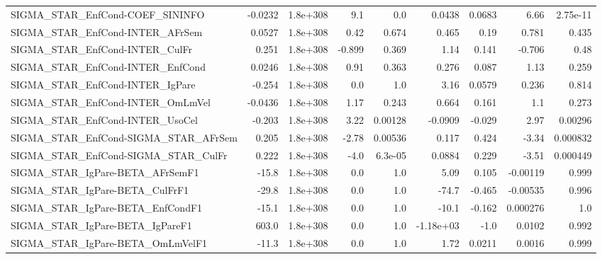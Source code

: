 \begin{tabular}{lrrrrrrrr}
SIGMA\_STAR\_EnfCond-COEF\_SININFO       &     -0.0232 &     1.8e+308 &      9.1 &      0.0 &     0.0438 &      0.0683 &         6.66 &      2.75e-11 \\
SIGMA\_STAR\_EnfCond-INTER\_AFrSem       &      0.0527 &     1.8e+308 &     0.42 &    0.674 &      0.465 &        0.19 &        0.781 &         0.435 \\
SIGMA\_STAR\_EnfCond-INTER\_CulFr        &       0.251 &     1.8e+308 &   -0.899 &    0.369 &       1.14 &       0.141 &       -0.706 &          0.48 \\
SIGMA\_STAR\_EnfCond-INTER\_EnfCond      &      0.0246 &     1.8e+308 &     0.91 &    0.363 &      0.276 &       0.087 &         1.13 &         0.259 \\
SIGMA\_STAR\_EnfCond-INTER\_IgPare       &      -0.254 &     1.8e+308 &      0.0 &      1.0 &       3.16 &      0.0579 &        0.236 &         0.814 \\
SIGMA\_STAR\_EnfCond-INTER\_OmLmVel      &     -0.0436 &     1.8e+308 &     1.17 &    0.243 &      0.664 &       0.161 &          1.1 &         0.273 \\
SIGMA\_STAR\_EnfCond-INTER\_UsoCel       &      -0.203 &     1.8e+308 &     3.22 &  0.00128 &    -0.0909 &      -0.029 &         2.97 &       0.00296 \\
SIGMA\_STAR\_EnfCond-SIGMA\_STAR\_AFrSem  &       0.205 &     1.8e+308 &    -2.78 &  0.00536 &      0.117 &       0.424 &        -3.34 &      0.000832 \\
SIGMA\_STAR\_EnfCond-SIGMA\_STAR\_CulFr   &       0.222 &     1.8e+308 &     -4.0 &  6.3e-05 &     0.0884 &       0.229 &        -3.51 &      0.000449 \\
SIGMA\_STAR\_IgPare-BETA\_AFrSemF1       &       -15.8 &     1.8e+308 &      0.0 &      1.0 &       5.09 &       0.105 &     -0.00119 &         0.999 \\
SIGMA\_STAR\_IgPare-BETA\_CulFrF1        &       -29.8 &     1.8e+308 &      0.0 &      1.0 &      -74.7 &      -0.465 &     -0.00535 &         0.996 \\
SIGMA\_STAR\_IgPare-BETA\_EnfCondF1      &       -15.1 &     1.8e+308 &      0.0 &      1.0 &      -10.1 &      -0.162 &     0.000276 &           1.0 \\
SIGMA\_STAR\_IgPare-BETA\_IgPareF1       &       603.0 &     1.8e+308 &      0.0 &      1.0 &  -1.18e+03 &        -1.0 &       0.0102 &         0.992 \\
SIGMA\_STAR\_IgPare-BETA\_OmLmVelF1      &       -11.3 &     1.8e+308 &      0.0 &      1.0 &       1.72 &      0.0211 &       0.0016 &         0.999 \\

\end{tabular}
